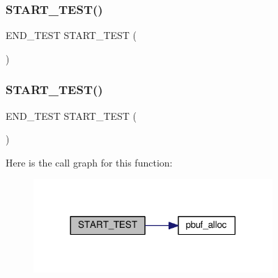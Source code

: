 \subsubsection{\texorpdfstring{S\+T\+A\+R\+T\+\_\+\+T\+E\+S\+T()}{START\_TEST()}\hspace{0.1cm}{\footnotesize\ttfamily [4/5]}}
{\footnotesize\ttfamily E\+N\+D\+\_\+\+T\+E\+ST S\+T\+A\+R\+T\+\_\+\+T\+E\+ST (\begin{DoxyParamCaption}\item[{test\+\_\+pbuf\+\_\+take\+\_\+at\+\_\+edge}]{ }\end{DoxyParamCaption})}

\mbox{\label{openmote-cc2538_2lwip_2test_2unit_2core_2test__pbuf_8c_acf20a4908a45f378233f25a41bccbb79}} 
\subsubsection{\texorpdfstring{S\+T\+A\+R\+T\+\_\+\+T\+E\+S\+T()}{START\_TEST()}\hspace{0.1cm}{\footnotesize\ttfamily [5/5]}}
{\footnotesize\ttfamily E\+N\+D\+\_\+\+T\+E\+ST S\+T\+A\+R\+T\+\_\+\+T\+E\+ST (\begin{DoxyParamCaption}\item[{test\+\_\+pbuf\+\_\+get\+\_\+put\+\_\+at\+\_\+edge}]{ }\end{DoxyParamCaption})}

Here is the call graph for this function\+:
\nopagebreak
\begin{figure}[H]
\begin{center}
\leavevmode
\includegraphics[width=257pt]{openmote-cc2538_2lwip_2test_2unit_2core_2test__pbuf_8c_acf20a4908a45f378233f25a41bccbb79_cgraph}
\end{center}
\end{figure}
